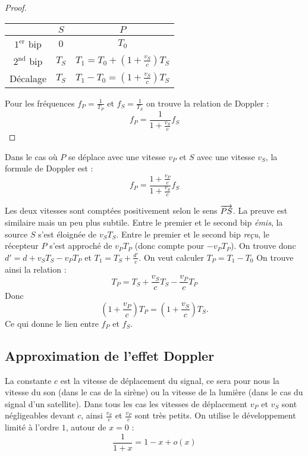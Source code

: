 \documentclass[class=report,crop=false]{standalone}
\begin{document}
\begin{proof}
\begin{center}
\setlength{\arrayrulewidth}{0.05mm}
\begin{tabular}[t]{ccc@{\vrule depth 2.5ex height 3.5ex width 0mm \ }} 
  \quad  \qquad         & \quad $S$ \quad     & \quad $P$ \quad          \\ \hline\hline
   $1^{\text{er}}$ bip  & $0$      & $T_0$         \\ \hline
   $2^{\text{nd}}$ bip  & $T_S$    & $T_1=T_0+\left(1+\frac{v_S}{c}\right)T_S$ \\ \hline
   Décalage             & $T_S$    & $T_1-T_0 = \left(1+\frac{v_S}{c}\right)T_S$  \\    
\end{tabular} 
\end{center}

Pour les fréquences $f_P = \frac{1}{T_P}$ et $f_S = \frac{1}{T_S}$ 
on trouve la relation de Doppler :
$$f_P = \frac{1}{ 1+\frac{v_S}{c}} f_S $$
\end{proof}


\begin{proposition}
Dans le cas où $P$ se déplace avec une vitesse $v_P$ et 
$S$ avec une vitesse $v_S$, la formule de Doppler est :
$$f_P = \frac{1+\frac{v_P}{c}}{1+\frac{v_S}{c}}f_S $$  
\end{proposition}



Les deux vitesses sont comptées positivement
selon le sens $\overrightarrow{PS}$.
La preuve est similaire mais un peu plus subtile. Entre le premier et le second bip \emph{émis}, la source $S$
s'est éloignée de $v_ST_S$. 
Entre le premier et le second bip \emph{reçu}, le récepteur $P$ s'est approché
de $v_PT_P$ (donc compte pour $-v_PT_P$).
On trouve donc $d' = d + v_ST_S - v_PT_P$ et
$T_1 = T_S + \frac{d'}{c}$. 
On veut calculer $T_P = T_1-T_0$
On trouve ainsi la relation :
$$T_P = T_S  + \frac{v_S}{c} T_S - \frac{v_P}{c} T_P$$
Donc 
$$\left(1+\frac{v_P}{c}\right) T_P = \left(1+\frac{v_S}{c}\right) T_S .$$
Ce qui donne le lien entre $f_P$ et $f_S$.


\subsection{Approximation de l'effet Doppler}

La constante $c$ est la vitesse de déplacement du signal, ce sera 
pour nous la vitesse du son (dans le cas de la sirène) ou la vitesse de la lumière
(dans le cas du signal d'un satellite).
Dans tous les cas les vitesses de déplacement $v_P$ et $v_S$ sont négligeables devant $c$,
ainsi $\frac{v_S}{c}$ et $\frac{v_P}{c}$ sont très petits.
On utilise le développement limité à l'ordre $1$, autour de $x=0$ :
$$\frac{1}{1+x} = 1 - x + o(x)$$
\end{document}
